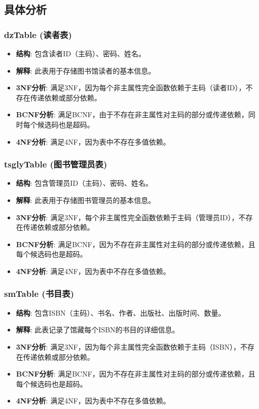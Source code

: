 \documentclass{ctexart}
\begin{document}
		\subsection{具体分析}

		\subsubsection{dzTable (读者表)}
\begin{itemize}
    \item \textbf{结构}: 包含读者ID（主码）、密码、姓名。
    \item \textbf{解释}: 此表用于存储图书馆读者的基本信息。
    \item \textbf{3NF分析}: 满足3NF，因为每个非主属性完全函数依赖于主码（读者ID），不存在传递依赖或部分依赖。
    \item \textbf{BCNF分析}: 满足BCNF，由于不存在非主属性对主码的部分或传递依赖，同时每个候选码也是超码。
    \item \textbf{4NF分析}: 满足4NF，因为表中不存在多值依赖。
\end{itemize}

\subsubsection{tsglyTable (图书管理员表)}
\begin{itemize}
    \item \textbf{结构}: 包含管理员ID（主码）、密码、姓名。
    \item \textbf{解释}: 此表用于存储图书管理员的基本信息。
    \item \textbf{3NF分析}: 满足3NF，每个非主属性完全函数依赖于主码（管理员ID），不存在传递依赖或部分依赖。
    \item \textbf{BCNF分析}: 满足BCNF，因为不存在非主属性对主码的部分或传递依赖，且每个候选码也是超码。
    \item \textbf{4NF分析}: 满足4NF，因为表中不存在多值依赖。
\end{itemize}

\subsubsection{smTable (书目表)}
\begin{itemize}
    \item \textbf{结构}: 包含ISBN（主码）、书名、作者、出版社、出版时间、数量。
    \item \textbf{解释}: 此表记录了馆藏每个ISBN的书目的详细信息。
    \item \textbf{3NF分析}: 满足3NF，因为每个非主属性完全函数依赖于主码（ISBN），不存在传递依赖或部分依赖。
    \item \textbf{BCNF分析}: 满足BCNF，因为不存在非主属性对主码的部分或传递依赖，且每个候选码也是超码。
    \item \textbf{4NF分析}: 满足4NF，因为表中不存在多值依赖。
\end{itemize}
\end{document}
